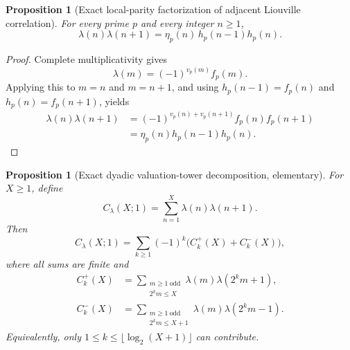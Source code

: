 \documentclass[11pt]{amsart}
\numberwithin{equation}{section}
\theoremstyle{plain}
\newtheorem{proposition}[theorem]{Proposition}
\theoremstyle{definition}
\theoremstyle{remark}
\newcommand{\liou}{\lambda}
\begin{document}
\begin{proposition}[Exact local-parity factorization of adjacent Liouville correlation]
\label{prop:eta_lambda_gauge_bridge}
For every prime $p$ and every integer $n\ge1$,
\begin{equation}
\liou(n)\liou(n+1)
=\eta_p(n)\,h_p(n-1)h_p(n).
\label{eq:eta_lambda_gauge_bridge}
\end{equation}
\end{proposition}

\begin{proof}
Complete multiplicativity gives
\begin{equation}
\liou(m)=(-1)^{v_p(m)}f_p(m).
\label{eq:lambda_vp_fp}
\end{equation}
Applying this to $m=n$ and $m=n+1$, and using $h_p(n-1)=f_p(n)$ and $h_p(n)=f_p(n+1)$, yields
\begin{align}
\liou(n)\liou(n+1)
&=(-1)^{v_p(n)+v_p(n+1)}f_p(n)f_p(n+1)\\
&=\eta_p(n)h_p(n-1)h_p(n).
\end{align}
\end{proof}

\begin{proposition}[Exact dyadic valuation-tower decomposition, elementary]
\label{prop:dyadic_chowla_decomposition}
For $X\ge1$, define
\begin{equation}
C_{\liou}(X;1)=\sum_{n=1}^{X}\liou(n)\liou(n+1).
\label{eq:lambda_adjacent_Cesaro}
\end{equation}
Then
\begin{equation}
\boxed{
C_{\liou}(X;1)
=\sum_{k\ge1}(-1)^k\bigl(C_k^+(X)+C_k^-(X)\bigr),}
\label{eq:dyadic_chowla_decomposition}
\end{equation}
where all sums are finite and
\begin{align}
C_k^+(X)
&=\sum_{\substack{m\ge1\ \mathrm{odd}\\2^km\le X}}
\liou(m)\liou(2^km+1),
\label{eq:dyadic_plus_piece}\\
C_k^-(X)
&=\sum_{\substack{m\ge1\ \mathrm{odd}\\2^km\le X+1}}
\liou(m)\liou(2^km-1).
\label{eq:dyadic_minus_piece}
\end{align}
Equivalently, only $1\le k\le\lfloor\log_2(X+1)\rfloor$ can contribute.
\end{proposition}
\end{document}
